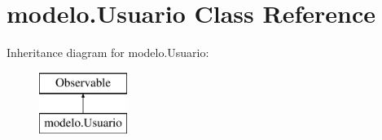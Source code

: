 \hypertarget{classmodelo_1_1_usuario}{}\section{modelo.\+Usuario Class Reference}
\label{classmodelo_1_1_usuario}
Inheritance diagram for modelo.\+Usuario\+:\begin{figure}[H]
\begin{center}
\leavevmode
\includegraphics[height=2.000000cm]{classmodelo_1_1_usuario}
\end{center}
\end{figure}
